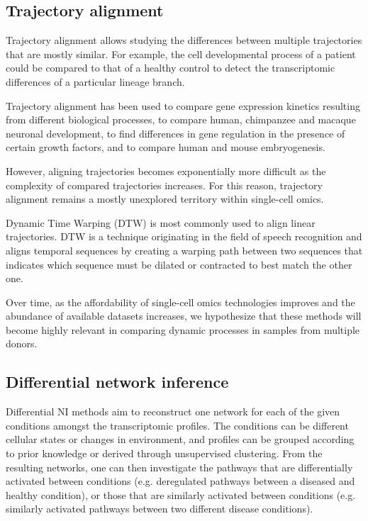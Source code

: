 \subsection{Trajectory alignment}
Trajectory alignment allows studying the differences between multiple trajectories that are mostly similar. For example, the cell developmental process of a patient could be compared to that of a healthy control to detect the transcriptomic differences of a particular lineage branch. 

Trajectory alignment has been used to compare gene expression kinetics resulting from different biological processes\cite{cacchiarelli_aligningsinglecelldevelopmental_2018}, to compare human, chimpanzee and macaque neuronal development\cite{kanton_organoidsinglecellgenomic_2019}, to find differences in gene regulation in the presence of certain growth factors\cite{mcfaline-figueroa_pooledsinglecellgenetic_2019}, and to compare human and mouse embryogenesis\cite{alpert_alignmentsinglecelltrajectories_2018}.

However, aligning trajectories becomes exponentially more difficult as the complexity of compared trajectories increases. For this reason, trajectory alignment remains a mostly unexplored territory within single-cell omics.

Dynamic Time Warping (DTW) \cite{giorgino_computingvisualizingdynamic_2009} is most commonly used to align linear trajectories. DTW is a technique originating in the field of speech recognition and aligns temporal sequences by creating a warping path between two sequences that indicates which sequence must be dilated or contracted to best match the other one.

Over time, as the affordability of single-cell omics technologies improves and the abundance of available datasets increases, we hypothesize that these methods will become highly relevant in comparing dynamic processes in samples from multiple donors.

\subsection{Differential network inference}
Differential NI methods aim to reconstruct one network for each of the given conditions amongst the transcriptomic profiles. The conditions can be different cellular states or changes in environment, and profiles can be grouped according to prior knowledge or derived through unsupervised clustering. From the resulting networks, one can then investigate the pathways that are differentially activated between conditions (e.g. deregulated pathways between a diseased and healthy condition), or those that are similarly activated between conditions (e.g. similarly activated pathways between two different disease conditions).

